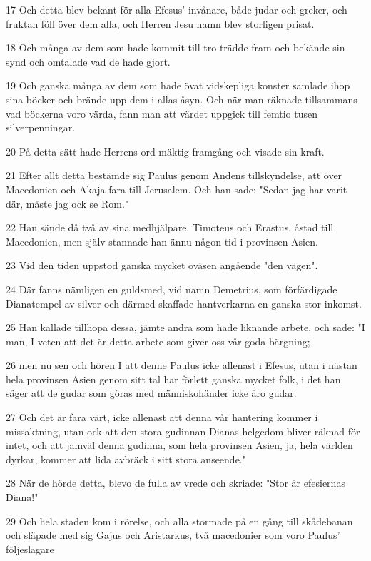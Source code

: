\par 17 Och detta blev bekant för alla Efesus' invånare, både judar och greker, och fruktan föll över dem alla, och Herren Jesu namn blev storligen prisat.
\par 18 Och många av dem som hade kommit till tro trädde fram och bekände sin synd och omtalade vad de hade gjort.
\par 19 Och ganska många av dem som hade övat vidskepliga konster samlade ihop sina böcker och brände upp dem i allas åsyn. Och när man räknade tillsammans vad böckerna voro värda, fann man att värdet uppgick till femtio tusen silverpenningar.
\par 20 På detta sätt hade Herrens ord mäktig framgång och visade sin kraft.
\par 21 Efter allt detta bestämde sig Paulus genom Andens tillskyndelse, att över Macedonien och Akaja fara till Jerusalem. Och han sade: "Sedan jag har varit där, måste jag ock se Rom."
\par 22 Han sände då två av sina medhjälpare, Timoteus och Erastus, åstad till Macedonien, men själv stannade han ännu någon tid i provinsen Asien.
\par 23 Vid den tiden uppstod ganska mycket oväsen angående "den vägen".
\par 24 Där fanns nämligen en guldsmed, vid namn Demetrius, som förfärdigade Dianatempel av silver och därmed skaffade hantverkarna en ganska stor inkomst.
\par 25 Han kallade tillhopa dessa, jämte andra som hade liknande arbete, och sade: "I man, I veten att det är detta arbete som giver oss vår goda bärgning;
\par 26 men nu sen och hören I att denne Paulus icke allenast i Efesus, utan i nästan hela provinsen Asien genom sitt tal har förlett ganska mycket folk, i det han säger att de gudar som göras med människohänder icke äro gudar.
\par 27 Och det är fara värt, icke allenast att denna vår hantering kommer i missaktning, utan ock att den stora gudinnan Dianas helgedom bliver räknad för intet, och att jämväl denna gudinna, som hela provinsen Asien, ja, hela världen dyrkar, kommer att lida avbräck i sitt stora anseende."
\par 28 När de hörde detta, blevo de fulla av vrede och skriade: "Stor är efesiernas Diana!"
\par 29 Och hela staden kom i rörelse, och alla stormade på en gång till skådebanan och släpade med sig Gajus och Aristarkus, två macedonier som voro Paulus' följeslagare
